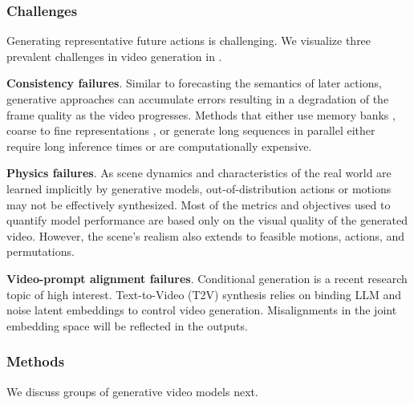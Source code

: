\subsubsection{Challenges}
\label{sec:forecasting::generation:::challeneges}


Generating representative future actions is challenging. We visualize three prevalent challenges in video generation in .

\noindent
\textbf{Consistency failures}. Similar to forecasting the semantics of later actions, generative approaches can accumulate errors resulting in a degradation of the frame quality as the video progresses. Methods that either use memory banks , coarse to fine representations , or generate long sequences in parallel  either require long inference times or are computationally expensive.

\noindent
\textbf{Physics failures}. As scene dynamics and characteristics of the real world are learned implicitly by generative models, out-of-distribution actions or motions may not be effectively synthesized. Most of the metrics and objectives used to quantify model performance are based only on the visual quality of the generated video. However, the scene's realism also extends to feasible motions, actions, and permutations.

\noindent
\textbf{Video-prompt alignment failures}. Conditional generation is a recent research topic of high interest. Text-to-Video (T2V) synthesis relies on binding LLM and noise latent embeddings to control video generation. Misalignments in the joint embedding space will be reflected in the outputs.



\subsubsection{Methods}
\label{sec:forecasting::generation:::methods}


We discuss groups of generative video models next.

